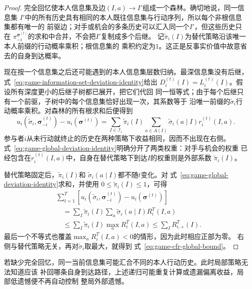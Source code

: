 \begin{proof}
完全回忆使本人信息集及边\((I,a)\to I'\)组成一个森林。确切地说，同一信息集
\(I'\)中的所有历史具有相同的本人既往信息集与行动序列，所以每个非根信息集都有唯一的
前驱边；对手或机会的多条历史可以汇入同一个\(I'\)，但这些历史只在
\(\pi_{-i}^{\bm{\sigma}^{(t)}}\)的求和中合并，不会把\(I'\)复制成多个后继。
记\(\widetilde{\pi}_i(I)\)为替代策略沿该唯一本人前缀的行动概率乘积；根信息集的
乘积约定为\(1\)。这正是反事实价值中故意省去的自身到达概率。

现在按一个信息集之后还可能遇到的本人信息集层数归纳。最深信息集没有后继，
式~\eqref{eq:game-information-set-deviation-identity}给出
\(D_i^{(t)}(I)=L_i^{(t)}(I)\)。假设所有深度更小的后继子树都已展开，把它们代回
同一恒等式；由于每个后继只有一个前驱，子树中的每个信息集恰好出现一次，其系数等于
沿唯一前缀的\(\widetilde{\sigma}_i\)行动概率乘积。对森林的所有根求和后便得到
\begin{equation}
  u_i(\widetilde{\sigma}_i,\bm{\sigma}_{-i}^{(t)})
  -
  u_i(\bm{\sigma}^{(t)})
  =
  \sum_{I\in\mathcal{I}_i}
  \widetilde{\pi}_i(I)
  \sum_{a\in A(I)}
  \widetilde{\sigma}_i(a\mid I)r_i^{(t)}(I,a).
  \label{eq:game-global-deviation-identity}
\end{equation}
参与者\(i\)从未行动就终止的历史在两种策略下收益相同，因而不出现在右侧。
式~\eqref{eq:game-global-deviation-identity}明确分开了两类权重：对手与机会的权重
已经包含在\(r_i^{(t)}(I,a)\)中，自身在替代策略下到达\(I\)的权重则是外部系数
\(\widetilde{\pi}_i(I)\)。

替代策略固定后，\(\widetilde{\pi}_i(I)\)和
\(\widetilde{\sigma}_i(a\mid I)\)都不随\(t\)变化。对
式~\eqref{eq:game-global-deviation-identity}求和，并使用
\(0\leq\widetilde{\pi}_i(I)\leq1\)，可得
\begin{align*}
  &\sum_{t=1}^{T}
  \left[
    u_i(\widetilde{\sigma}_i,\bm{\sigma}_{-i}^{(t)})
    -
    u_i(\bm{\sigma}^{(t)})
  \right]\\
  &\quad=
  \sum_I
  \widetilde{\pi}_i(I)
  \sum_a
  \widetilde{\sigma}_i(a\mid I)R_i^T(I,a)\\
  &\quad\leq
  \sum_I
  \widetilde{\pi}_i(I)
  \max_a R_i^T(I,a)
  \leq
  \sum_I R_{i,+}^T(I).
\end{align*}
最后一个不等式也覆盖\(\max_aR_i^T(I,a)<0\)的情形，因为此时相应正部为零。
右侧与替代策略无关，再对\(\widetilde{\sigma}_i\)取最大，就得到
式~\eqref{eq:game-cfr-global-bound}。
\end{proof}

若缺少完全回忆，同一当前信息集可能汇合不同的本人行动历史。此时局部策略无法知道应该
补回哪条自身到达路径，上述递归可能重复计算或遗漏偏离收益，局部低遗憾便不再自动控制
整局外部遗憾。

